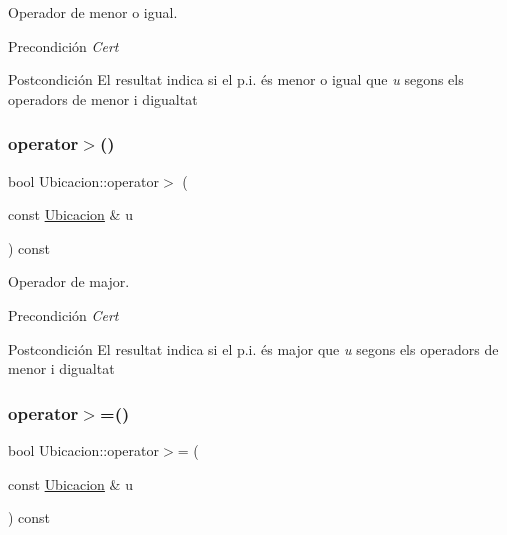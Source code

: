 Operador de menor o igual. 

\begin{DoxyPrecond}{Precondición}
{\itshape Cert} 
\end{DoxyPrecond}
\begin{DoxyPostcond}{Postcondición}
El resultat indica si el p.\+i. és menor o igual que {\itshape u} segons els operadors de menor i d\textquotesingle{}igualtat 
\end{DoxyPostcond}
\mbox{\label{class_ubicacion_abde3b350c4f55f59964fabbc17ed164f}} 
\subsubsection{\texorpdfstring{operator$>$()}{operator>()}}
{\footnotesize\ttfamily bool Ubicacion\+::operator$>$ (\begin{DoxyParamCaption}\item[{const \hyperlink{class_ubicacion}{Ubicacion} \&}]{u }\end{DoxyParamCaption}) const}



Operador de major. 

\begin{DoxyPrecond}{Precondición}
{\itshape Cert} 
\end{DoxyPrecond}
\begin{DoxyPostcond}{Postcondición}
El resultat indica si el p.\+i. és major que {\itshape u} segons els operadors de menor i d\textquotesingle{}igualtat 
\end{DoxyPostcond}
\mbox{\label{class_ubicacion_a0ea3b04b8b0ef5a3482049d3ddf63f3b}} 
\subsubsection{\texorpdfstring{operator$>$=()}{operator>=()}}
{\footnotesize\ttfamily bool Ubicacion\+::operator$>$= (\begin{DoxyParamCaption}\item[{const \hyperlink{class_ubicacion}{Ubicacion} \&}]{u }\end{DoxyParamCaption}) const}



